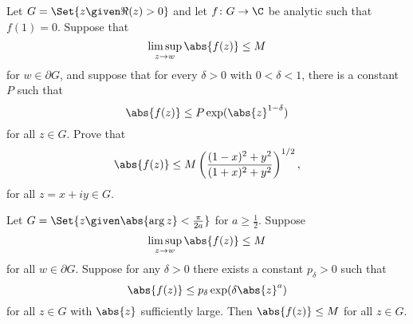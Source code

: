 \begin{exercise}
	Let $G = \Set{z \given \Re(z) > 0}$ and let $f \colon G \to \C$ be analytic such that $f(1) = 0$.
	Suppose that
	\[
		\limsup_{z \to w} \abs{f(z)} \leq M
	\]
	for $w \in \partial G$, and suppose that for every $\delta > 0$ with $0 < \delta < 1$, there is a constant $P$ such that
	\[
		\abs{f(z)} \leq P \exp(\abs{z}^{1 - \delta})
	\]
	for all $z \in G$.
	Prove that
	\[
		\abs{f(z)} \leq M \left ( \frac{(1 - x)^2 + y^2}{(1 + x)^2 + y^2} \right )^{1/2},
	\]
	for all $z = x + i y \in G$.
\end{exercise}

\begin{corollary}\label{cor6.12}
	Let $G = \Set{z \given \abs{\arg z} < \frac{\pi}{2 a}}$ for $a \geq \frac{1}{2}$.
	Suppose
	\[
		\limsup_{z \to w} \abs{f(z)} \leq M
	\]
	for all $w \in \partial G$.
	Suppose for any $\delta > 0$ there exists a constant $p_\delta > 0$ such that
	\[
		\abs{f(z)} \leq p_\delta \exp(\delta \abs{z}^a)
	\]
	for all $z \in G$ with $\abs{z}$ sufficiently large.
	Then $\abs{f(z)} \leq M$ for all $z \in G$.
\end{corollary}

